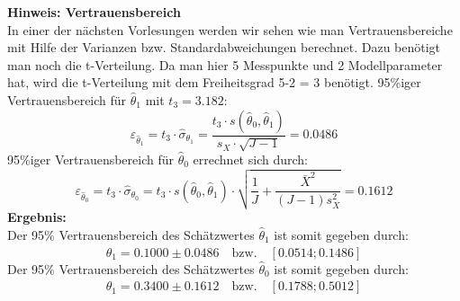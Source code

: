 \textbf{Hinweis: Vertrauensbereich} \\
In einer der nächsten Vorlesungen werden wir sehen wie man Vertrauensbereiche 
mit Hilfe der Varianzen bzw. Standardabweichungen berechnet. Dazu benötigt man 
noch die t-Verteilung. Da man hier 5 Messpunkte und 2 Modellparameter hat,
wird die t-Verteilung mit dem Freiheitsgrad 5-2 = 3 benötigt. 
95\%iger Vertrauensbereich für $\hat\theta_1$ mit $t_3 = 3.182$: 
\[
\varepsilon _{\hat{\theta}_1} = t_3 \cdot \hat\sigma_{\theta_1} = \frac{t_3 \cdot s(\hat{\theta}_0 ,
	\hat{\theta}_1 )}{s_X \cdot \sqrt {J
		- 1} } = 0.0486
\]
95\%iger Vertrauensbereich für $\hat\theta_0$ errechnet sich durch:
\[
\varepsilon _{\hat{\theta}_0} = t_3 \cdot \hat\sigma_{\theta_0} = t_3 \cdot s(\hat{\theta}_0 ,\hat{\theta}_1 ) \cdot \sqrt {\frac{1}{J} + \frac{\bar {X}^2}{(J - 1) s_X^2 }} = 0.1612
\]
\textbf{Ergebnis:} \\ 
Der 95\% Vertrauensbereich des Schätzwertes $\hat\theta_1$ ist somit gegeben durch:
\begin{equation}
\hat\theta_1 = 0.1000 \pm 0.0486 \quad \text{bzw.} \quad [0.0514;0.1486]
\end{equation}
Der 95\% Vertrauensbereich des Schätzwertes $\hat\theta_0$ ist somit gegeben durch: 
\begin{equation}
\hat\theta_1 = 0.3400 \pm 0.1612 \quad \text{bzw.} \quad [0.1788;0.5012]
\end{equation}

